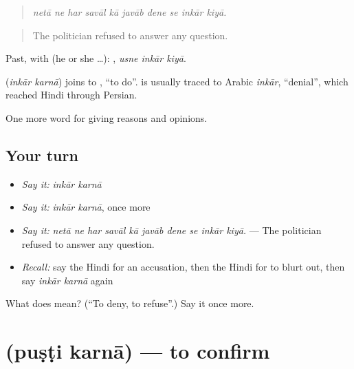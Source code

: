 \begin{quote}
         
\end{quote}

\begin{quote}
\emph{netā ne har savāl kā javāb dene se inkār kiyā.}
\end{quote}

\begin{quote}
The politician refused to answer any question.
\end{quote}

Past, with  (he or she …):   , \emph{usne inkār kiyā}.

\begin{cousinweb}
\textbf{ } (\emph{inkār karnā}) joins  to , \textquotedblleft{}to do\textquotedblright{}.  is usually traced to Arabic \emph{inkār}, \textquotedblleft{}denial\textquotedblright{}, which reached Hindi through Persian.
\end{cousinweb}

\begin{grammarlens}[title={What you've built}]
One more word for giving reasons and opinions.
\end{grammarlens}

\subsection*{Your turn}
\begin{itemize}
\raggedright
  \item \emph{Say it:} \emph{inkār karnā}
  \item \emph{Say it:} \emph{inkār karnā}, once more
  \item \emph{Say it:} \emph{netā ne har savāl kā javāb dene se inkār kiyā.} — The politician refused to answer any question.
  \item \emph{Recall:} say the Hindi for an accusation, then the Hindi for to blurt out, then say \emph{inkār karnā} again
\end{itemize}

\begin{tcolorbox}[breakable,colback=teal!4,colframe=teal!35!black,title={Before you move on}]
What does   mean? (\textquotedblleft{}To deny, to refuse\textquotedblright{}.) Say it once more.
\end{tcolorbox}
\section[\texorpdfstring{\hi{पुष्टि} \hi{करना} (puṣṭi karnā)}{पुष्टि करना (puṣṭi karnā)}]{  (puṣṭi karnā) — to confirm}

